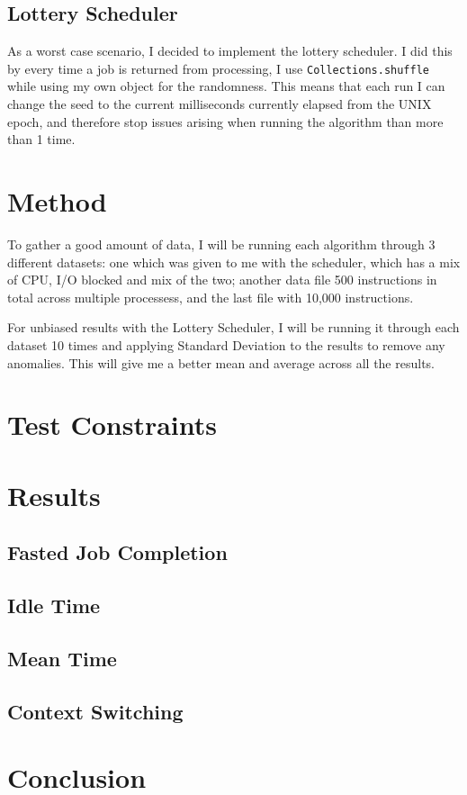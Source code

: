 \documentclass{acm_proc_article-sp}
\begin{document}
\subsection{Lottery Scheduler}

As a worst case scenario, I decided to implement the lottery scheduler. I did this by every time a job is returned from processing, I use \texttt{Collections.shuffle} while using my own object for the randomness. This means that each run I can change the seed to the current milliseconds currently elapsed from the UNIX epoch, and therefore stop issues arising when running the algorithm than more than 1 time.

\section{Method}

To gather a good amount of data, I will be running each algorithm through 3 different datasets: one which was given to me with the scheduler, which has a mix of CPU, I/O blocked and mix of the two; another data file 500 instructions in total across multiple processess, and the last file with 10,000 instructions. 

For unbiased results with the Lottery Scheduler, I will be running it through each dataset 10 times and applying Standard Deviation to the results to remove any anomalies. This will give me a better mean and average across all the results.

\section{Test Constraints}

\section{Results}

\subsection{Fasted Job Completion}

\subsection{Idle Time}

\subsection{Mean Time}

\subsection{Context Switching}

\section{Conclusion}
\end{document}
